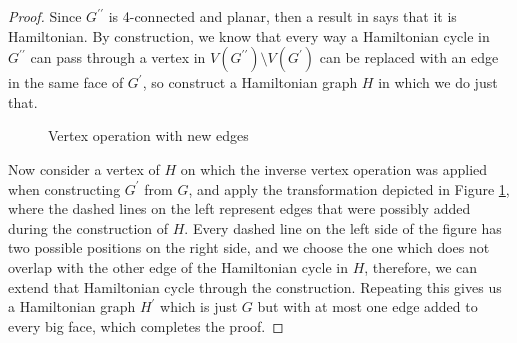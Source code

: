 \documentclass{scrartcl}
\theoremstyle{definition}
\theoremstyle{plain}
\begin{document}
\begin{proof}
    Since $G^{\prime\prime}$ is 4-connected and planar, then a result in \cite{Tutte1956-dq} says
    that it is Hamiltonian.
    By construction, we know that every way a Hamiltonian cycle in $G^{\prime\prime}$ can pass
    through a vertex in $V(G^{\prime\prime})\setminus V(G^\prime)$ can be replaced with an edge in
    the same face of $G^\prime$, so construct a Hamiltonian graph $H$ in which we do just that.
    \begin{figure}
        \centering
        \caption{Vertex operation with new edges}
        \label{fig:vertex operation with new edges}
    \end{figure}
    Now consider a vertex of $H$ on which the inverse vertex operation was applied when
    constructing $G^\prime$ from $G$, and apply the transformation depicted in Figure
    \ref{fig:vertex operation with new edges}, where the dashed lines on the left represent edges
    that were possibly added during the construction of $H$.
    Every dashed line on the left side of the figure has two possible positions on the right side,
    and we choose the one which does not overlap with the other edge of the Hamiltonian cycle in
    $H$, therefore, we can extend that Hamiltonian cycle through the construction.
    Repeating this gives us a Hamiltonian graph $H^\prime$ which is just $G$ but with at most one
    edge added to every big face, which completes the proof.
\end{proof}
\end{document}
